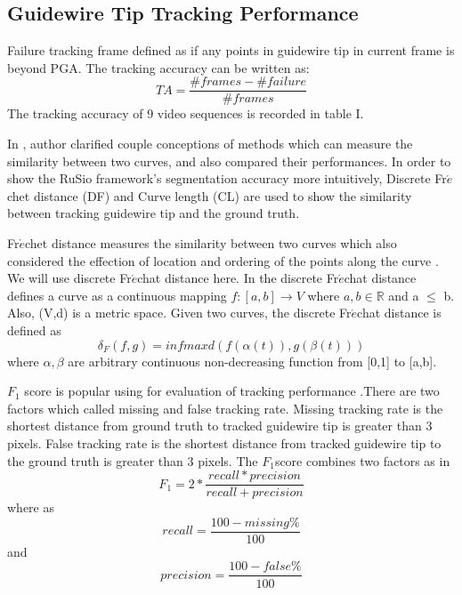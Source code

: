 \documentclass[journal]{IEEEtran}
\begin{document}
\subsection{Guidewire Tip Tracking Performance}
Failure tracking frame defined as if any points in guidewire tip in current frame is beyond PGA. The tracking accuracy can be written as: 
\begin{equation}
TA= \frac{\#frames - \#failure}{\#frames}
\end{equation} 
The tracking accuracy of 9 video sequences is recorded in table I. 

In \cite{Jekel2018Similarity}, author clarified couple conceptions of methods which can measure the similarity between two curves, and also compared their performances. In order to show the RuSio framework’s segmentation accuracy more intuitively, Discrete Fr$\acute{e}$chet distance (DF) and Curve length (CL) are used to show the similarity between tracking guidewire tip and the ground truth.\par
Fr$\acute{e}$chet distance measures the similarity between two curves which also considered the effection of location and ordering of the points along the curve \cite{Eiter1994Computing}. We will use discrete Fr$\acute{e}$chat distance here. In\cite{Eiter1994Computing} the discrete Fr$\acute{e}$chat distance defines a curve as a continuous mapping $f:[a,b] \rightarrow V$ where $a,b  \in  \mathbb{R}$ and a $\leq$ b. Also, (V,d) is a metric space. Given two curves, the discrete Fr$\acute{e}$chat distance is defined as 
\begin{equation}
\delta_F(f,g) =  infmaxd(f(\alpha(t)),g(\beta(t)))
\end{equation}
where $\alpha, \beta$ are arbitrary continuous non-decreasing function from [0,1] to [a,b].\par

$F_{1}$ score is popular using for evaluation of tracking performance \cite{vandini2017robust}\cite{Peng2009Robust}\cite{6671560} .There are two factors which called missing and false tracking rate.
Missing tracking rate is the shortest distance from ground truth to tracked guidewire tip is greater than 3 pixels. 
False tracking rate is the shortest distance from tracked guidewire tip to the ground truth is greater than 3 pixels.
The $F_{1}$score combines two factors as in \cite{vandini2017robust}\cite{6671560}
\begin{equation}
F_{1} = 2*\frac{recall*precision}{recall+precision}
\end{equation}
where as 
\begin{equation}
recall = \frac{100-missing\%}{100}
\end{equation}
and
\begin{equation}
precision = \frac{100-false\%}{100}
\end{equation}
\end{document}
